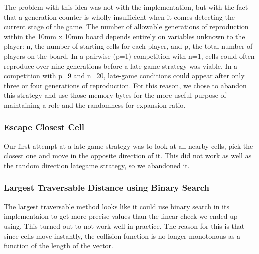 The problem with this idea was not with the implementation, but with the fact that a generation counter is wholly insufficient when it comes detecting the current stage of the game. The number of allowable generations of reproduction within the 10mm x 10mm board depends entirely on variables unknown to the player: n, the number of starting cells for each player, and p, the total number of players on the board. In a pairwise (p=1) competition with n=1, cells could often reproduce over nine generations before a late-game strategy was viable. In a competition with p=9 and n=20, late-game conditions could appear after only three or four generations of reproduction. For this reason, we chose to abandon this strategy and use those memory bytes for the more useful purpose of maintaining a role and the randomness for expansion ratio.\\

\subsubsection{Escape Closest Cell}
Our first attempt at a late game strategy was to look at all nearby cells, pick the closest one and move in the opposite direction of it. This did not work as well as the random direction lategame strategy, so we abandoned it.\\

\subsubsection{Largest Traversable Distance using Binary Search}
The largest traversable method looks like it could use binary search in its implementaion to get more precise values than the linear check we ended up using. This turned out to not work well in practice. The reason for this is that since cells move instantly, the collision function is no longer monotonous as a function of the length of the vector.
